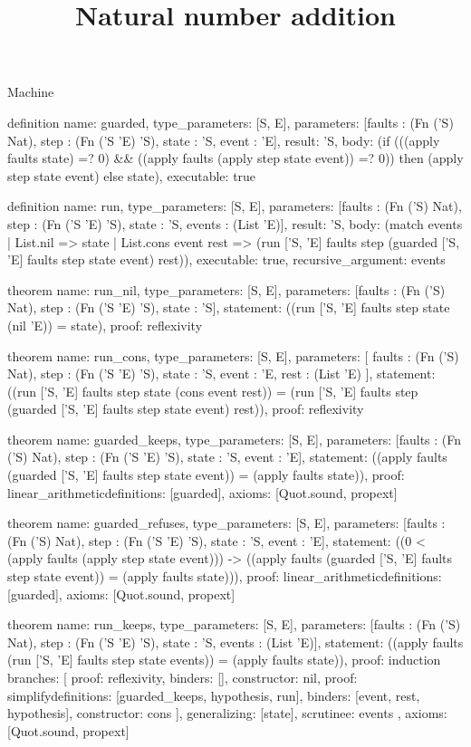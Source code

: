 \begin{lexlean}{Machine}
\title{Natural number addition}
\begin{semanticmodule}
definition{
  name: guarded,
  type_parameters: [S, E],
  parameters: [faults : (Fn ('S) Nat), step : (Fn ('S 'E) 'S), state : 'S, event : 'E],
  result: 'S,
  body: (if (((apply faults state) =? 0) && ((apply faults (apply step state event)) =? 0)) then (apply step state event) else state),
  executable: true
}

definition{
  name: run,
  type_parameters: [S, E],
  parameters: [faults : (Fn ('S) Nat), step : (Fn ('S 'E) 'S), state : 'S, events : (List 'E)],
  result: 'S,
  body: (match events
    | List.nil => state
    | List.cons event rest => (run ['S, 'E] faults step (guarded ['S, 'E] faults step state event) rest)),
  executable: true,
  recursive_argument: events
}

theorem{
  name: run_nil,
  type_parameters: [S, E],
  parameters: [faults : (Fn ('S) Nat), step : (Fn ('S 'E) 'S), state : 'S],
  statement: ((run ['S, 'E] faults step state (nil 'E)) = state),
  proof: reflexivity{}
}

theorem{
  name: run_cons,
  type_parameters: [S, E],
  parameters: [
    faults : (Fn ('S) Nat),
    step : (Fn ('S 'E) 'S),
    state : 'S,
    event : 'E,
    rest : (List 'E)
  ],
  statement: ((run ['S, 'E] faults step state (cons event rest)) = (run ['S, 'E] faults step (guarded ['S, 'E] faults step state event) rest)),
  proof: reflexivity{}
}

theorem{
  name: guarded_keeps,
  type_parameters: [S, E],
  parameters: [faults : (Fn ('S) Nat), step : (Fn ('S 'E) 'S), state : 'S, event : 'E],
  statement: ((apply faults (guarded ['S, 'E] faults step state event)) = (apply faults state)),
  proof: linear_arithmetic{definitions: [guarded]},
  axioms: [Quot.sound, propext]
}

theorem{
  name: guarded_refuses,
  type_parameters: [S, E],
  parameters: [faults : (Fn ('S) Nat), step : (Fn ('S 'E) 'S), state : 'S, event : 'E],
  statement: ((0 < (apply faults (apply step state event))) -> ((apply faults (guarded ['S, 'E] faults step state event)) = (apply faults state))),
  proof: linear_arithmetic{definitions: [guarded]},
  axioms: [Quot.sound, propext]
}

theorem{
  name: run_keeps,
  type_parameters: [S, E],
  parameters: [faults : (Fn ('S) Nat), step : (Fn ('S 'E) 'S), state : 'S, events : (List 'E)],
  statement: ((apply faults (run ['S, 'E] faults step state events)) = (apply faults state)),
  proof: induction{
    branches: [
      {proof: reflexivity{}, binders: [], constructor: nil},
      {
        proof: simplify{definitions: [guarded_keeps, hypothesis, run]},
        binders: [event, rest, hypothesis],
        constructor: cons
      }
    ],
    generalizing: [state],
    scrutinee: events
  },
  axioms: [Quot.sound, propext]
}
\end{semanticmodule}
\end{lexlean}

